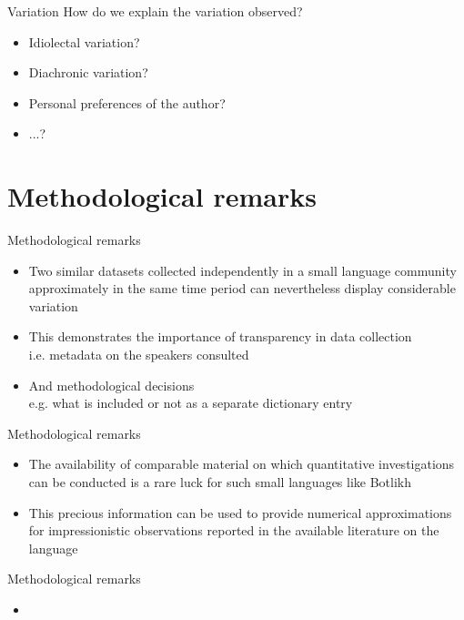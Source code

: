 \begin{frame}{Variation}
How do we explain the variation observed?
\begin{itemize}
    \item Idiolectal variation?
    \item Diachronic variation?
    \item Personal preferences of the author?
    \item ...?
\end{itemize}
\end{frame}

\section{Methodological remarks}
\begin{frame}{Methodological remarks}
\begin{itemize}
    \item Two similar datasets collected independently in a small language community approximately in the same time period can nevertheless display considerable variation
    \item This demonstrates the importance of transparency in data collection \\ i.e. metadata on the speakers consulted
    \item And methodological decisions \\ e.g. what is included or not as a separate dictionary entry
\end{itemize}
\end{frame}

\begin{frame}{Methodological remarks}
\begin{itemize}
    \item The availability of comparable material on which quantitative investigations can be conducted is a rare luck for such small languages like Botlikh
    \item This precious information can be used to provide numerical approximations for impressionistic observations reported in the available literature on the language
\end{itemize}
\end{frame}

\begin{frame}{Methodological remarks}
\begin{itemize}
    \item 
\end{itemize}
\end{frame}

